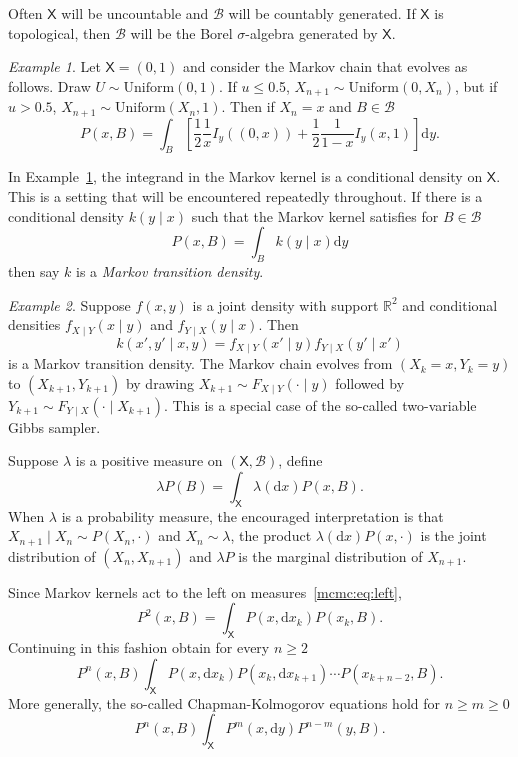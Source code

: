 \documentclass[12pt]{article}
\theoremstyle{plain}
\theoremstyle{definition}
\theoremstyle{remark}
\newtheorem{example}{Example}[section]
\newcommand{\df}{\mathrm{d}}
\newcommand{\X}{\mathsf{X}}
\newcommand{\B}{\mathcal{B}}
\begin{document}
Often $\X$ will be uncountable and $\B$ will be countably
generated.  If $\X$ is topological, then $\B$ will be the Borel
$\sigma$-algebra generated by $\X$.

\begin{example}
  \label{mcmc:ex:betawalk}
 Let $\X  = (0,1)$ and consider the Markov chain that evolves as
 follows. Draw $U \sim \text{Uniform}(0,1)$.  If $u \le 0.$5, $X_{n+1}
 \sim \text{Uniform}(0, X_n)$, but if $u > 0.5$, $X_{n+1}
 \sim \text{Uniform}(X_n, 1)$.  Then if $X_n = x$ and $B \in \B$
 \[
P(x, B) = \int_{B} \left[ \frac{1}{2} \frac{1}{x} I_{y}((0,x)) +
  \frac{1}{2} \frac{1}{1-x} I_{y}(x,1) \right] \df y .
 \]
\end{example}

In Example~\ref{mcmc:ex:betawalk}, the integrand in the Markov kernel
is a conditional density on $\X$.  This is a setting that will be
encountered repeatedly throughout.  If there is a conditional density
$k (y \mid x)$ such that the Markov kernel satisfies for $B \in \B$
\[
P(x, B) = \int_{B} k(y \mid x) \df y
\]
then say $k$ is a {\em Markov transition density}.

\begin{example}
  \label{mcmc:ex:2varGS}
Suppose $f(x,y)$ is a joint density with support $\mathbb{R}^2$ and
conditional densities $f_{X \mid Y}(x \mid y)$ and $f_{Y \mid X}(y
\mid x)$.  Then
\[
  k(x', y' \mid x, y) = f_{X \mid Y}(x' \mid y) f_{Y \mid X}(y' \mid x')
\]
is a Markov transition density.  The Markov chain evolves from
$(X_k = x, Y_k =y)$ to $(X_{k+1}, Y_{k+1})$ by drawing
$X_{k+1} \sim F_{X \mid Y} (\cdot \mid y)$ followed by
$Y_{k+1} \sim F_{Y \mid X}(\cdot \mid X_{k+1})$.  This is a special
case of the so-called two-variable Gibbs sampler.
\end{example}


Suppose $\lambda$ is a positive measure on $(\X, \B)$,  define
\begin{equation}
  \label{mcmc:eq:left}
\lambda P(B) = \int_{\X} \lambda(\df x) P(x, B) .
\end{equation}
When $\lambda$ is a probability measure, the encouraged interpretation
is that $X_{n+1} \mid X_{n} \sim P(X_{n}, \cdot)$ and
$X_{n} \sim \lambda$, the product $\lambda(\df x) P(x, \cdot)$ is the
joint distribution of $(X_n, X_{n+1})$ and $\lambda P$ is the marginal
distribution of $X_{n+1}$.

Since Markov kernels act to the left on measures~\eqref{mcmc:eq:left},
\[
P^2(x, B) = \int_{\X} P(x, \df x_k) P(x_k, B) .
\]
Continuing in this fashion obtain for every $n \ge 2$
\[
P^n(x, B) \int_{\X} P(x, \df x_k) P(x_k, \df x_{k+1}) \cdots P(x_{k +
  n -2}, B) .
\]
More generally, the so-called Chapman-Kolmogorov equations hold for $n
\ge m \ge 0$
\[
P^n(x, B) \int_{\X} P^m(x, \df y) P^{n-m} (y, B) .
\]
\end{document}
